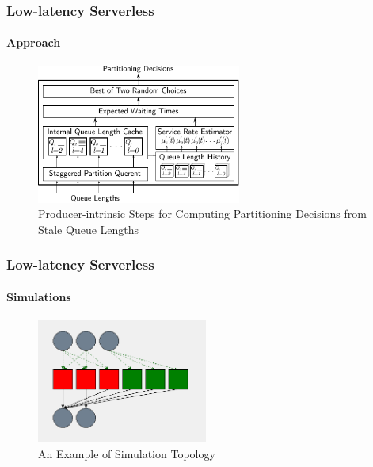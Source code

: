 \documentclass[aspectratio=169]{beamer}
\begin{document}
\begin{frame}
	\frametitle{Low-latency Serverless}
	\framesubtitle{Approach}

	\begin{figure}[h]
		\centering
		\includegraphics[width=0.6\textwidth]{service}
		\caption{Producer-intrinsic Steps for Computing Partitioning Decisions from Stale Queue Lengths}
	\end{figure}
\end{frame}

\begin{frame}
	\frametitle{Low-latency Serverless}
	\framesubtitle{Simulations}

	\begin{figure}[h]
		\centering
		\includegraphics[width=0.5\textwidth]{diffservices-topology}
		\caption{An Example of Simulation Topology}
	\end{figure}
\end{frame}
\end{document}
